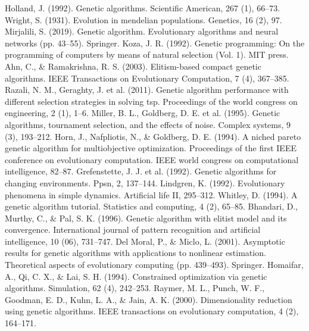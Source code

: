 \documentclass[12pt, a4paper, oneside]{ctexart}
\numberwithin{equation}{section}  %
\begin{document}
\clearpage
\begin{thebibliography}{99}
     Holland, J. (1992). Genetic algorithms. Scientific American, 267 (1), 66–73.
     Wright, S. (1931). Evolution in mendelian populations. Genetics, 16 (2), 97.
     Mirjalili, S. (2019). Genetic algorithm. Evolutionary algorithms and neural networks (pp. 43–55). Springer.
    Koza, J. R. (1992). Genetic programming: On the programming of computers by means of natural selection (Vol. 1). MIT press. 
    Ahn, C., \& Ramakrishna, R. S. (2003). Elitism-based compact genetic algorithms. IEEE Transactions on Evolutionary Computation, 7 (4), 367–385.
    Razali, N. M., Geraghty, J. et al. (2011). Genetic algorithm performance with different selection strategies in solving tsp. Proceedings of the world congress on engineering, 2 (1), 1–6.
    Miller, B. L., Goldberg, D. E. et al. (1995). Genetic algorithms, tournament selection, and the effects of noise. Complex systems, 9 (3), 193–212.
    Horn, J., Nafpliotis, N., \& Goldberg, D. E. (1994). A niched pareto genetic algorithm for multiobjective optimization. Proceedings of the first IEEE conference on evolutionary computation. IEEE world congress on computational intelligence, 82–87.
    Grefenstette, J. J. et al. (1992). Genetic algorithms for changing environments. Ppsn, 2, 137–144.
    Lindgren, K. (1992). Evolutionary phenomena in simple dynamics. Artificial life II, 295–312.
    Whitley, D. (1994). A genetic algorithm tutorial. Statistics and computing, 4 (2), 65–85.
    Bhandari, D., Murthy, C., \& Pal, S. K. (1996). Genetic algorithm with elitist model and its convergence. International journal of pattern recognition and artificial intelligence, 10 (06), 731–747.
    Del Moral, P., \& Miclo, L. (2001). Asymptotic results for genetic algorithms with applications to nonlinear estimation. Theoretical aspects of evolutionary computing (pp. 439–493). Springer.
    Homaifar, A., Qi, C. X., \& Lai, S. H. (1994). Constrained optimization via genetic algorithms. Simulation, 62 (4), 242–253.
    Raymer, M. L., Punch, W. F., Goodman, E. D., Kuhn, L. A., \& Jain, A. K. (2000). Dimensionality reduction using genetic algorithms. IEEE transactions on evolutionary computation, 4 (2), 164–171.

\end{thebibliography}
\end{document}
